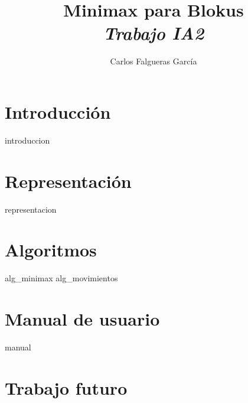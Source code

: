 \documentclass[pdftex,a4paper,12pt]{article}
\title{{\Huge Minimax para Blokus} \\ {\large\slshape Trabajo IA2}}
\author{Carlos Falgueras García}
\begin{document}
\maketitle
\tableofcontents
\setlength{\parskip}{1em}
\thispagestyle{empty} %
\clearpage

\section{Introducción}
{introduccion}
\clearpage

\section{Representación}
{representacion}
\clearpage

\section{Algoritmos}
{alg_minimax}
\clearpage
{alg_movimientos}
\clearpage

\section{Manual de usuario}
{manual}
\clearpage

\section{Trabajo futuro}
\end{document}
